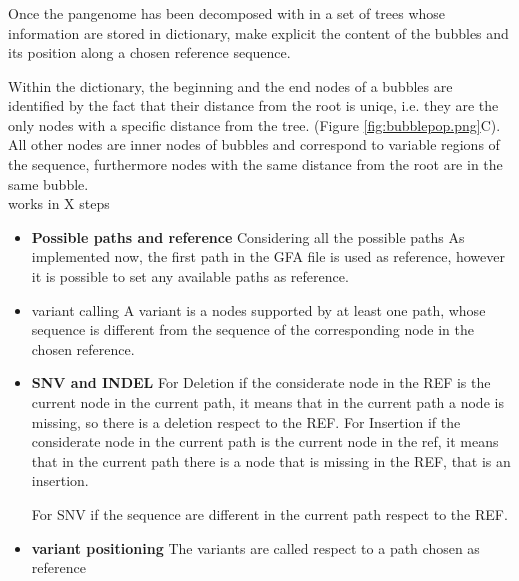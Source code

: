 \subsubsection{\bbc}
Once the pangenome has been decomposed with \bbp in a set of trees whose information are stored in dictionary, \bbp make explicit the content of the bubbles and its position along a chosen reference sequence.    

Within the dictionary, the beginning and the end nodes of a bubbles are identified by the fact that their distance from the root is uniqe, i.e. they are the only nodes with a specific distance from the tree. (Figure \ref{fig:bubblepop.png}C). All other nodes are  inner nodes of bubbles and correspond to variable regions of the sequence, furthermore nodes with the same distance from the root are in the same bubble.\\

\bbc works in X steps

\begin{itemize}


\item\textbf{Possible paths and reference }
Considering all the possible paths %
As implemented now, the first path in the GFA file is used as reference, however it is possible to set any available paths as reference.

\item{variant calling }  A variant is a nodes supported by at least one path, whose sequence is different from the sequence of the corresponding node in the chosen reference.

\item\textbf{SNV and INDEL}
For Deletion if the considerate node in the REF is the current node in the current path, it means that in the current path a node is missing, so there is a deletion respect to the REF.
For Insertion if the considerate node in the current path is the current node in the ref, it means that in the current path there is a node that is missing in the REF, that is an insertion.

For SNV if the sequence are different in the current path respect to the REF.

\item \textbf{variant positioning} The variants are called respect to a path chosen as reference%
\end{itemize}







